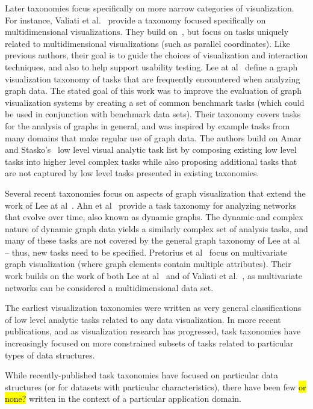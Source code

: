 \documentclass{egpubl}
\begin{document}
Later taxonomies focus specifically on more narrow categories of visualization.
For instance, Valiati et al.~\cite{Valiati2006} provide a taxonomy focused specifically on multidimensional visualizations. They build on~\cite{Wehrend1990}, but focus on tasks uniquely related to multidimensional visualizations (such as parallel coordinates).
Like previous authors, their goal is to guide the choices of visualization and interaction techniques, and also to  help support usability testing.
Lee at al~\cite{Lee2006} define a graph visualization taxonomy of tasks that are frequently encountered when analyzing graph data.
The stated goal of this work was to improve the evaluation of graph visualization systems by creating a set of common benchmark tasks (which could be used in conjunction with benchmark data sets).
Their taxonomy covers tasks for the analysis of graphs in general, and was inspired by example tasks from many domains that make regular use of graph data.
The authors build on Amar and Stasko's~\cite{Amar2005} low level visual analytic task list by composing existing low level tasks into higher level complex tasks while also proposing additional tasks that are not captured by low level tasks presented in existing taxonomies.


Several recent taxonomies focus on aspects of graph visualization that extend the work of Lee at al~\cite{Lee2006}.
Ahn et al~\cite{Ahn2014} provide a task taxonomy for analyzing networks that evolve over time, also known as dynamic graphs.
The dynamic and complex nature of dynamic graph data yields a similarly complex set of analysis tasks, and many of these tasks are not covered by the general graph taxonomy of Lee at al~\cite{Lee2006} -- thus, new tasks need to be specified.
Pretorius et al~\cite{Pretorius2014} focus on multivariate graph visualization (where graph elements contain multiple attributes).
Their work builds on the work of both Lee at al~\cite{Lee2006} and of Valiati et al.~\cite{Valiati2006}, as multivariate networks can be considered a multidimensional data set.

The earliest visualization taxonomies were written as very general classifications of low level analytic tasks related to any data visualization. In more recent publications, and as visualization research has progressed, task taxonomies have increasingly focused on more constrained subsets of tasks related to particular types of data structures.

While recently-published task taxonomies have focused on particular data structures (or for datasets with particular characteristics), there have been few \hl{or none?} written in the context of a particular application domain.
\end{document}
